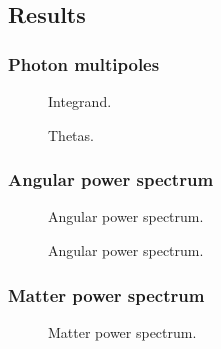 \subsection{Results}\label{ssec:M4:results}

\subsubsection{Photon multipoles} \label{sssec:M4:results:photons_multipoles}
\begin{figure}[ht!]
    \caption{Integrand.}
    \label{fig:M4:results:integrand_thetas}
\end{figure}


\begin{figure}[ht!]
    \caption{Thetas. }
    \label{fig:M4:results:thetas}
\end{figure}

\subsubsection{Angular power spectrum} \label{sssec:M4:results:angular_power_spectrum}
\begin{figure}[ht!]
    \caption{Angular power spectrum.}
    \label{fig:M4:results:cells}
\end{figure}


\begin{figure}[ht!]
    \caption{Angular power spectrum.}
    \label{fig:M4:results:cells_components}
\end{figure}

\subsubsection{Matter power spectrum} \label{sssec:M4:results:matter_power_spectrum}
\begin{figure}[ht!]
    \caption{Matter power spectrum.}
    \label{fig:M4:results:matterPS_nk1000}
\end{figure}